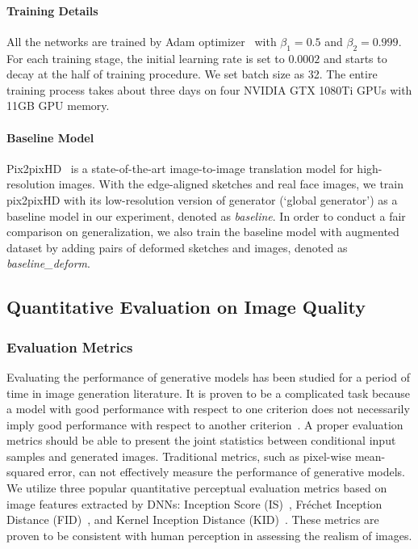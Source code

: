 \paragraph{Training Details}
All the networks are trained by Adam optimizer~\cite{Adam} with $\beta_1=0.5$ and $\beta_2=0.999$. 
For each training stage, the initial learning rate is set to $0.0002$ and starts to decay at the half of training procedure. 
We set batch size as 32. 
The entire training process takes about three days on four NVIDIA GTX 1080Ti GPUs with 11GB GPU memory.



\paragraph{Baseline Model} 
Pix2pixHD~\cite{pix2pixHD} is a state-of-the-art image-to-image translation model for high-resolution images. 
With the edge-aligned sketches and real face images, we train pix2pixHD with its low-resolution version of generator (`global generator') as a baseline model in our experiment, denoted as \textit{baseline}. 
In order to conduct a fair comparison on generalization, we also train the baseline model with augmented dataset by adding pairs of deformed sketches and images, denoted as \textit{baseline\_deform}.
%


\subsection{Quantitative Evaluation on Image Quality}

\subsubsection{Evaluation Metrics} 
Evaluating the performance of generative models has been studied for a period of time in image generation literature.
It is proven to be a complicated task because a model with good performance with respect to one criterion does not necessarily imply good performance with respect to another criterion~\cite{GANs_equal}. 
A proper evaluation metrics should be able to present the joint statistics between conditional input samples and generated images.
Traditional metrics, such as pixel-wise mean-squared error, can not effectively measure the performance of generative models. 
We utilize three popular quantitative perceptual evaluation metrics based on image features extracted by DNNs: Inception Score (IS)~\cite{Improved_Techniques}, Fréchet Inception Distance (FID)~\cite{FID},
and Kernel Inception Distance (KID)~\cite{KID}. 
These metrics are proven to be consistent with human perception in assessing the realism of images.


